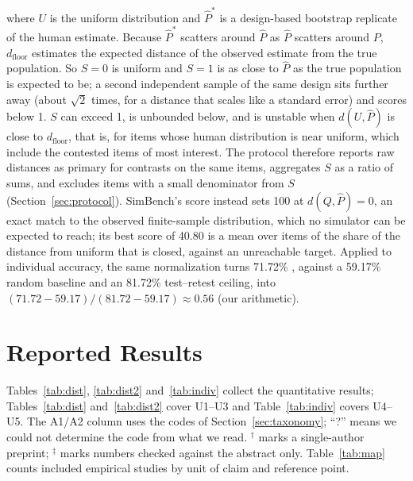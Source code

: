 \documentclass[11pt]{article}
\newcommand{\sa}{$^\dagger$}
\newcommand{\ab}{$^\ddagger$}
\begin{document}
where $U$ is the uniform distribution and $\hat P^{*}$ is a design-based bootstrap replicate of the human estimate. Because $\hat P^{*}$ scatters around $\hat P$ as $\hat P$ scatters around $P$, $d_{\text{floor}}$ estimates the expected distance of the observed estimate from the true population. So $S = 0$ is uniform and $S = 1$ is as close to $\hat P$ as the true population is expected to be; a second independent sample of the same design sits further away (about $\sqrt 2$ times, for a distance that scales like a standard error) and scores below 1. $S$ can exceed 1, is unbounded below, and is unstable when $d(U, \hat P)$ is close to $d_{\text{floor}}$, that is, for items whose human distribution is near uniform, which include the contested items of most interest. The protocol therefore reports raw distances as primary for contrasts on the same items, aggregates $S$ as a ratio of sums, and excludes items with a small denominator from $S$ (Section~\ref{sec:protocol}). SimBench's score \citep{hu2025simbench} instead sets 100 at $d(Q,\hat P)=0$, an exact match to the observed finite-sample distribution, which no simulator can be expected to reach; its best score of 40.80 is a mean over items of the share of the distance from uniform that is closed, against an unreachable target. Applied to individual accuracy, the same normalization turns 71.72\% \citep{toubia2025twin}, against a 59.17\% random baseline and an 81.72\% test--retest ceiling, into $(71.72 - 59.17)/(81.72 - 59.17) \approx 0.56$ (our arithmetic).

\section{Reported Results}
\label{sec:table}

Tables~\ref{tab:dist}, \ref{tab:dist2} and~\ref{tab:indiv} collect the quantitative results; Tables~\ref{tab:dist} and~\ref{tab:dist2} cover U1--U3 and Table~\ref{tab:indiv} covers U4--U5. The A1/A2 column uses the codes of Section~\ref{sec:taxonomy}; ``?'' means we could not determine the code from what we read. \sa{} marks a single-author preprint; \ab{} marks numbers checked against the abstract only. Table~\ref{tab:map} counts included empirical studies by unit of claim and reference point.
\end{document}

